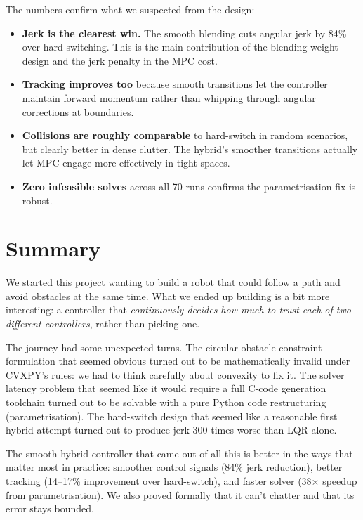 \documentclass[12pt,a4paper]{article}
\begin{document}
The numbers confirm what we suspected from the design:
\begin{itemize}
  \item \textbf{Jerk is the clearest win.} The smooth blending cuts angular
    jerk by 84\% over hard-switching. This is the main contribution of the
    blending weight design and the jerk penalty in the MPC cost.
  \item \textbf{Tracking improves too} because smooth transitions let the
    controller maintain forward momentum rather than whipping through
    angular corrections at boundaries.
  \item \textbf{Collisions are roughly comparable} to hard-switch in random
    scenarios, but clearly better in dense clutter. The hybrid's smoother
    transitions actually let MPC engage more effectively in tight spaces.
  \item \textbf{Zero infeasible solves} across all 70 runs confirms the
    parametrisation fix is robust.
\end{itemize}

\section{Summary}

We started this project wanting to build a robot that could follow a path
and avoid obstacles at the same time. What we ended up building is a bit
more interesting: a controller that \emph{continuously decides how much to
trust each of two different controllers}, rather than picking one.

The journey had some unexpected turns. The circular obstacle constraint
formulation that seemed obvious turned out to be mathematically invalid
under CVXPY's rules: we had to think carefully about convexity to fix
it. The solver latency problem that seemed like it would require a full
C-code generation toolchain turned out to be solvable with a pure Python
code restructuring (parametrisation). The hard-switch design that seemed
like a reasonable first hybrid attempt turned out to produce jerk 300
times worse than LQR alone.

The smooth hybrid controller that came out of all this is better in the
ways that matter most in practice: smoother control signals (84\% jerk
reduction), better tracking (14--17\% improvement over hard-switch), and
faster solver (38$\times$ speedup from parametrisation). We also proved
formally that it can't chatter and that its error stays bounded.
\end{document}
